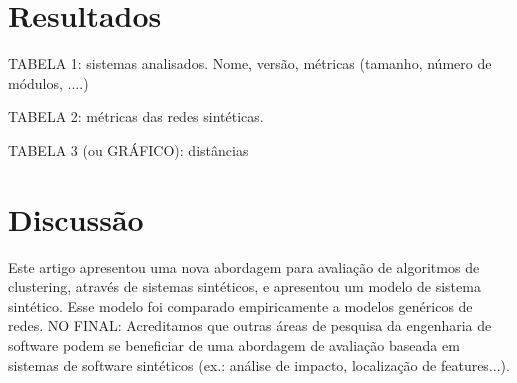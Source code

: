 \documentclass{acm_proc_article-sp}
\begin{document}




\section{Resultados} %

TABELA 1: sistemas analisados. Nome, versão, métricas (tamanho, número de módulos, ....)

TABELA 2: métricas das redes sintéticas.

TABELA 3 (ou GRÁFICO): distâncias


\section{Discussão} %

Este artigo apresentou uma nova abordagem para avaliação de algoritmos de clustering, através de sistemas sintéticos, e apresentou um modelo de sistema sintético. Esse modelo foi comparado empiricamente a modelos genéricos de redes. NO FINAL: Acreditamos que outras áreas de pesquisa da engenharia de software podem se beneficiar de uma abordagem de avaliação baseada em sistemas de software sintéticos (ex.: análise de impacto, localização de features...).
\end{document}
